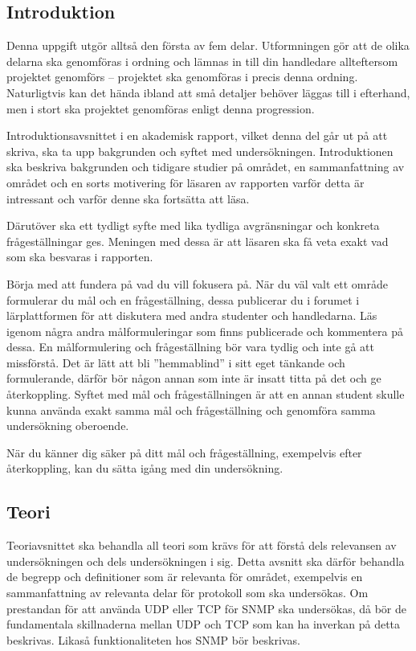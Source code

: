\documentclass[a4paper]{miunasgn}
\begin{document}
\subsection{Introduktion}

Denna uppgift utgör alltså den första av fem delar.
Utformningen gör att de olika delarna ska genomföras i ordning och lämnas in 
till din handledare allteftersom projektet genomförs -- projektet ska 
genomföras i precis denna ordning.
Naturligtvis kan det hända ibland att små detaljer behöver läggas till 
i efterhand, men i stort ska projektet genomföras enligt denna progression.

Introduktionsavsnittet i en akademisk rapport, vilket denna del går ut på att 
skriva, ska ta upp bakgrunden och syftet med undersökningen.
Introduktionen ska beskriva bakgrunden och tidigare studier på området, en 
sammanfattning av området och en sorts motivering för läsaren av rapporten 
varför detta är intressant och varför denne ska fortsätta att läsa.

Därutöver ska ett tydligt syfte med lika tydliga avgränsningar och konkreta 
frågeställningar ges.
Meningen med dessa är att läsaren ska få veta exakt vad som ska besvaras 
i rapporten.

Börja med att fundera på vad du vill fokusera på.
När du väl valt ett område formulerar du mål och en frågeställning, dessa 
publicerar du i forumet i lärplattformen för att diskutera med andra studenter 
och handledarna.
Läs igenom några andra målformuleringar som finns publicerade och kommentera på 
dessa.
En målformulering och frågeställning bör vara tydlig och inte gå att 
missförstå.
Det är lätt att bli ''hemmablind'' i sitt eget tänkande och formulerande, 
därför bör någon annan som inte är insatt titta på det och ge återkoppling.
Syftet med mål och frågeställningen är att en annan student skulle kunna 
använda exakt samma mål och frågeställning och genomföra samma undersökning 
oberoende.

När du känner dig säker på ditt mål och frågeställning, exempelvis efter 
återkoppling, kan du sätta igång med din undersökning.

\subsection{Teori}

Teoriavsnittet ska behandla all teori som krävs för att förstå dels relevansen 
av undersökningen och dels undersökningen i sig.
Detta avsnitt ska därför behandla de begrepp och definitioner som är relevanta 
för området, exempelvis en sammanfattning av relevanta delar för protokoll som 
ska undersökas.
Om prestandan för att använda UDP eller TCP för SNMP ska undersökas, då bör de 
fundamentala skillnaderna mellan UDP och TCP som kan ha inverkan på detta 
beskrivas.
Likaså funktionaliteten hos SNMP bör beskrivas.
\end{document}
